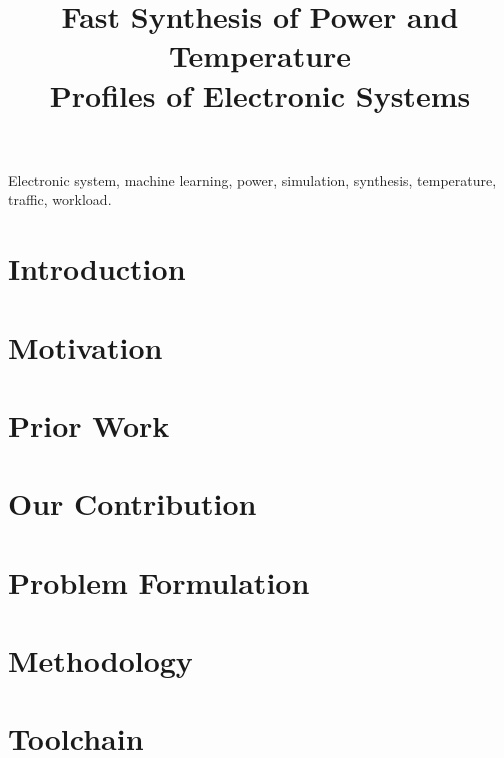 \documentclass[conference]{IEEEtran}
\title{
  Fast Synthesis of Power and Temperature\\
  Profiles of Electronic Systems
  \vspace{-1.5em}
}
\author{}
\begin{document}
  \maketitle
  \thispagestyle{plain}
  \pagestyle{plain}

  \begin{abstract}
    
  \end{abstract}

  \begin{IEEEkeywords}
    Electronic system,
    machine learning,
    power,
    simulation,
    synthesis,
    temperature,
    traffic,
    workload.
  \end{IEEEkeywords}


  \section{Introduction} 
  

  \section{Motivation} 
  

  \section{Prior Work}

  \section{Our Contribution} 
  
  

  \section{Problem Formulation} 
  

  \section{Methodology} 
  

  \section{Toolchain} 
  
\end{document}

